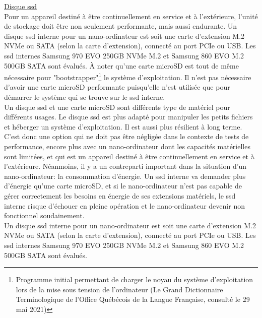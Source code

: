 \par\underline{Disque \acrshort{ssd}}
\vspace{0.5\baselineskip}
\\
\noindent Pour un appareil destiné à être continuellement en service et à l'extérieure, l'unité de stockage doit être non seulement performante, mais aussi endurante. Un disque \acrshort{ssd} interne pour un nano-ordinateur est soit une carte d'extension M.2 NVMe ou SATA (selon la carte d'extension), connecté au port PCIe ou USB. Les \acrshort{ssd} internes Samsung 970 EVO 250GB NVMe M.2 et Samsung 860 EVO M.2 500GB SATA sont évalués. À noter qu'une carte microSD est tout de même nécessaire pour "bootstrapper"\footnote{Programme initial permettant de charger le noyau du système d'exploitation lors de la mise sous tension de l'ordinateur (Le Grand Dictionnaire Terminologique de l'Office Québécois de la Langue Française, consulté le 29 mai 2021)} le système d'exploitation. Il n'est pas nécessaire d'avoir une carte microSD performante puisqu'elle n'est utilisée que pour démarrer le système qui se trouve sur le \acrshort{ssd} interne. 
\vspace{0.5\baselineskip}
\\
\noindent Un disque \acrshort{ssd} et une carte microSD sont différents type de matériel pour différents usages. Le disque \acrshort{ssd} est plus adapté pour manipuler les petits fichiers et héberger un système d'exploitation. Il est aussi plus résilient à long terme. C'est donc une option qui ne doit pas être négligée dans le contexte de tests de performance, encore plus avec un nano-ordinateur dont les capacités matérielles sont limitées, et qui est un appareil destiné à être continuellement en service et à l'extérieure. Néanmoins, il y a un contreparti important dans la situation d'un nano-ordinateur: la consommation d'énergie. Un \acrshort{ssd} interne va demander plus d'énergie qu'une carte microSD, et si le nano-ordinateur n'est pas capable de gérer correctement les besoins en énergie de ses extensions matériels, le \acrshort{ssd} interne risque d'échouer en pleine opération et le nano-ordinateur devenir non fonctionnel soudainement.
\vspace{0.5\baselineskip}
\\
\noindent Un disque \acrshort{ssd} interne pour un nano-ordinateur est soit une carte d'extension M.2 NVMe ou SATA (selon la carte d'extension), connecté au port PCIe ou USB. Les \acrshort{ssd} internes Samsung 970 EVO 250GB NVMe M.2 et Samsung 860 EVO M.2 500GB SATA sont évalués.
